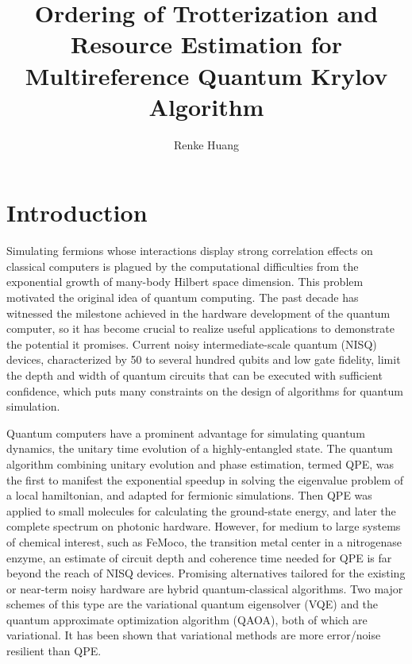 \documentclass[journal=jctcce,manuscript=article]{achemso}
\author{Renke Huang}
\affiliation{Department of Chemistry and Cherry Emerson Center for Scientific Computation, Emory University, Atlanta, GA, 30322}
\title{Ordering of Trotterization and Resource Estimation for Multireference Quantum Krylov Algorithm }
\let\oldmaketitle\maketitle
\let\maketitle\relax
\begin{document}



\section{Introduction}

Simulating fermions whose interactions display strong correlation effects on classical computers is plagued by the computational difficulties from the exponential growth of many-body Hilbert space dimension.\cite{Laughlin:2000br} 
This problem motivated the original idea of quantum computing.\cite{Feynman:1982gn,manin1980computable} 
The past decade has witnessed the milestone achieved in the hardware development of the quantum computer,\cite{Arute:2019fg} so it has become crucial to realize useful applications to demonstrate the potential it promises. Current noisy intermediate-scale quantum (NISQ) devices,\cite{Preskill:2018gt} characterized by 50 to several hundred qubits and low gate fidelity, limit the depth and width of quantum circuits that can be executed with sufficient confidence, which puts many constraints on the design of algorithms for quantum simulation.

Quantum computers have a prominent advantage for simulating quantum dynamics, the unitary time evolution of a highly-entangled state.\cite{Kassal:2008bf}
The quantum algorithm combining unitary evolution and phase estimation, termed QPE, was the first to manifest the exponential speedup in solving the eigenvalue problem of a local hamiltonian,\cite{Abrams:1997ha,Abrams:1999ur} and adapted for fermionic simulations.\cite{Ortiz:2001jn} 
Then QPE was applied to small molecules for calculating the ground-state energy,\cite{AspuruGuzik:dj} and later the complete spectrum on photonic hardware.\cite{Lanyon:2010jf}
However, for medium to large systems of chemical interest, such as FeMoco, the transition metal center in a nitrogenase enzyme, an estimate of circuit depth and coherence time needed for QPE is far beyond the reach of NISQ devices.\cite{Reiher:2017cv}
Promising alternatives tailored for the existing or near-term noisy hardware are hybrid quantum-classical algorithms. Two major schemes of this type are the variational quantum eigensolver (VQE)\cite{Peruzzo:2014kc,Yung:2014iv,McClean:2015bs} and the quantum approximate optimization algorithm (QAOA),\cite{Farhi:2014wl} both of which are variational. It has been shown that variational methods are more error/noise resilient than QPE.\cite{McClean:2017ct,Cao:2019jn}
\end{document}
